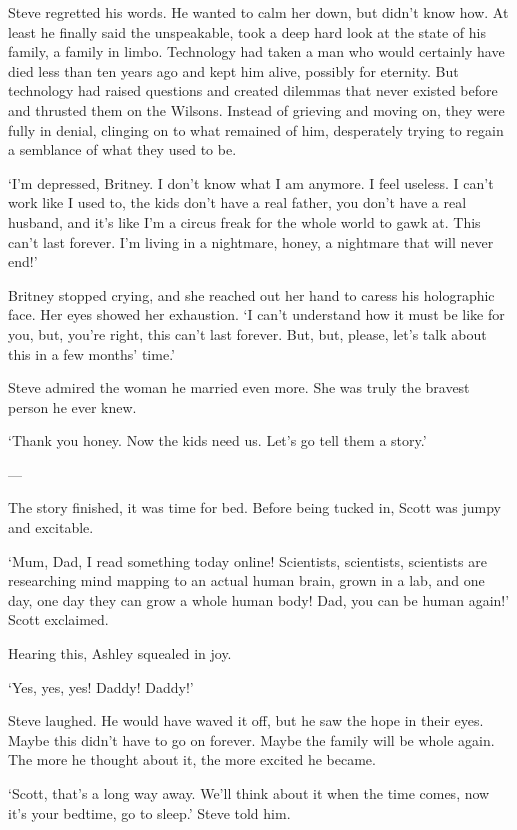 Steve regretted his words. He wanted to calm her down, but didn't know how. At least he finally said the unspeakable, took a deep hard look at the state of his family, a family in limbo. Technology had taken a man who would certainly have died less than ten years ago and kept him alive, possibly for eternity. But technology had raised questions and created dilemmas that never existed before and thrusted them on the Wilsons. Instead of grieving and moving on, they were fully in denial, clinging on to what remained of him, desperately trying to regain a semblance of what they used to be.

`I'm depressed, Britney. I don't know what I am anymore. I feel useless. I can't work like I used to, the kids don't have a real father, you don't have a real husband, and it's like I'm a circus freak for the whole world to gawk at. This can't last forever. I'm living in a nightmare, honey, a nightmare that will never end!'

Britney stopped crying, and she reached out her hand to caress his holographic face. Her eyes showed her exhaustion. `I can't understand how it must be like for you, but, you're right, this can't last forever. But, but, please, let's talk about this in a few months' time.'

Steve admired the woman he married even more. She was truly the bravest person he ever knew. 

`Thank you honey. Now the kids need us. Let's go tell them a story.'

---

The story finished, it was time for bed. Before being tucked in, Scott was jumpy and excitable.

`Mum, Dad, I read something today online! Scientists, scientists, scientists are researching mind mapping to an actual human brain, grown in a lab, and one day, one day they can grow a whole human body! Dad, you can be human again!' Scott exclaimed.

Hearing this, Ashley squealed in joy.

`Yes, yes, yes! Daddy! Daddy!'

Steve laughed. He would have waved it off, but he saw the hope in their eyes. Maybe this didn't have to go on forever. Maybe the family will be whole again. The more he thought about it, the more excited he became.

`Scott, that's a long way away. We'll think about it when the time comes, now it's your bedtime, go to sleep.' Steve told him.


